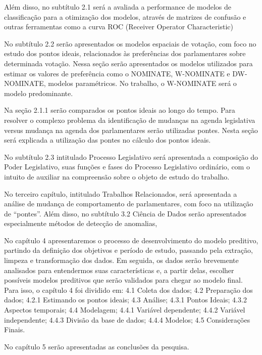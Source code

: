 Além disso, no subtítulo 2.1 será a avaliada a performance de modelos de
classificação para a otimização dos modelos, através de matrizes de confusão e
outras ferramentas como a curva ROC (Receiver Operator Characteristic) 

No subtítulo 2.2 serão apresentados os modelos espaciais de votação, com foco
no estudo dos pontos ideais, relacionados às preferências dos parlamentares
sobre determinada votação. Nessa seção serão apresentados os modelos utilizados
para estimar os valores de preferência como o NOMINATE, W-NOMINATE e
DW-NOMINATE, modelos paramétricos. No trabalho, o W-NOMINATE será o modelo
predominante. 

Na seção 2.1.1 serão comparados os pontos ideais ao longo do tempo. Para
resolver o complexo problema da identificação de mudanças na agenda legislativa
versus mudança na agenda dos parlamentares serão utilizadas pontes. Nesta seção
será explicada a utilização das pontes no cálculo dos pontos ideais.

No subtítulo 2.3 intitulado Processo Legislativo será apresentada a composição
do Poder Legislativo, suas funções e fases do Processo Legislativo ordinário,
com o intuito de auxiliar na compreensão sobre o objeto de estudo do trabalho.   

No terceiro capítulo, intitulado Trabalhos Relacionados, será apresentada a
análise de mudança de comportamento de parlamentares, com foco na utilização de
“pontes”. Além disso, no subtítulo 3.2 Ciência de Dados serão apresentados
especialmente métodos de detecção de anomalias, 

No capítulo 4 apresentaremos o processo de desenvolvimento do modelo preditivo,
partindo da definição dos objetivos e período de estudo, passando pela
extração, limpeza e transformação dos dados. Em seguida, os dados serão
brevemente analisados para entendermos suas características e, a partir delas,
escolher possíveis modelos preditivos que serão validados para chegar ao modelo
final. Para isso, o capítulo 4 foi dividido em: 4.1 Coleta dos dados; 4.2
Preparação dos dados; 4.2.1 Estimando os pontos ideais; 4.3 Análise; 4.3.1
Pontos Ideais; 4.3.2 Aspectos temporais; 4.4 Modelagem; 4.4.1 Variável
dependente; 4.4.2 Variável independente; 4.4.3 Divisão da base de dados; 4.4.4
Modelos; 4.5 Considerações Finais.

No capítulo 5 serão apresentadas as conclusões da pesquisa.   
